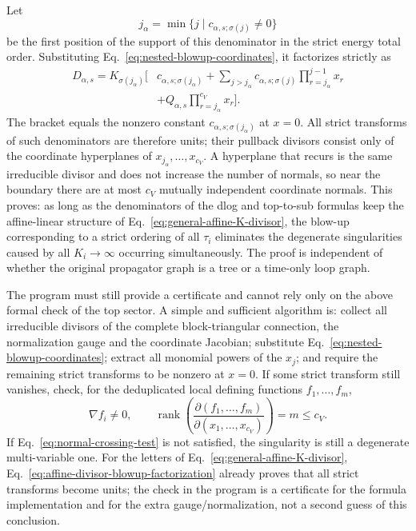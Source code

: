 \documentclass[11pt,a4paper]{article}
\begin{document}
Let
\begin{equation}
 j_\alpha=\min\{j\mid c_{\alpha,s;\sigma(j)}\neq0\}
\end{equation}
be the first position of the support of this denominator in the strict energy total order. Substituting Eq.~\eqref{eq:nested-blowup-coordinates}, it factorizes strictly as
\begin{equation}
 \begin{split}
 D_{\alpha,s}
 =K_{\sigma(j_\alpha)}\Bigg[&c_{\alpha,s;\sigma(j_\alpha)}
 +\sum_{j>j_\alpha}c_{\alpha,s;\sigma(j)}
   \prod_{r=j_\alpha}^{j-1}x_r\\
 &+Q_{\alpha,s}\prod_{r=j_\alpha}^{c_V}x_r\Bigg].
 \end{split}
 \label{eq:affine-divisor-blowup-factorization}
\end{equation}
The bracket equals the nonzero constant $c_{\alpha,s;\sigma(j_\alpha)}$ at $x=0$. All strict transforms of such denominators are therefore units; their pullback divisors consist only of the coordinate hyperplanes of $x_{j_\alpha},\ldots,x_{c_V}$. A hyperplane that recurs is the same irreducible divisor and does not increase the number of normals, so near the boundary there are at most $c_V$ mutually independent coordinate normals. This proves: as long as the denominators of the dlog and top-to-sub formulas keep the affine-linear structure of Eq.~\eqref{eq:general-affine-K-divisor}, the blow-up corresponding to a strict ordering of all $\tau_i$ eliminates the degenerate singularities caused by all $K_i\to\infty$ occurring simultaneously. The proof is independent of whether the original propagator graph is a tree or a time-only loop graph.

The program must still provide a certificate and cannot rely only on the above formal check of the top sector. A simple and sufficient algorithm is: collect all irreducible divisors of the complete block-triangular connection, the normalization gauge and the coordinate Jacobian; substitute Eq.~\eqref{eq:nested-blowup-coordinates}; extract all monomial powers of the $x_j$; and require the remaining strict transforms to be nonzero at $x=0$. If some strict transform still vanishes, check, for the deduplicated local defining functions $f_1,\ldots,f_m$,
\begin{equation}
 \nabla f_i\neq0,
 \qquad
 \operatorname{rank}\!\left(\frac{\partial(f_1,\ldots,f_m)}
 {\partial(x_1,\ldots,x_{c_V})}\right)=m\leq c_V.
 \label{eq:normal-crossing-test}
\end{equation}
If Eq.~\eqref{eq:normal-crossing-test} is not satisfied, the singularity is still a degenerate multi-variable one. For the letters of Eq.~\eqref{eq:general-affine-K-divisor}, Eq.~\eqref{eq:affine-divisor-blowup-factorization} already proves that all strict transforms become units; the check in the program is a certificate for the formula implementation and for the extra gauge/normalization, not a second guess of this conclusion.
\end{document}
